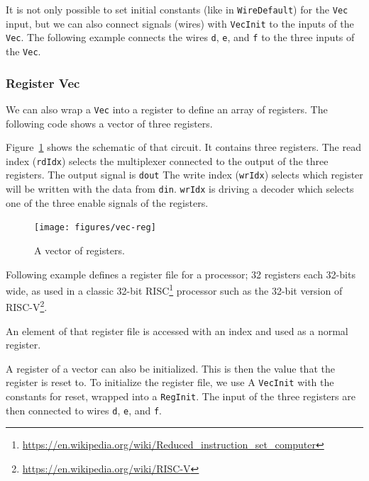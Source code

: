 \documentclass[%
    10pt,
    headinclude, footexclude,
    openright, %
    notitlepage,
    cleardoubleempty,
    headsepline,
    pointlessnumbers,
    bibtotoc, idxtotoc,
    ]{scrbook}
\newcommand{\code}[1]{{\lstinline[basicstyle=\small\ttfamily]{#1}}}
\newcommand{\myref}[2]{\href{#1}{#2}}
\renewcommand{\myref}[2]{{#2}{\footnote{\url{#1}}}}
\begin{document}

It is not only possible to set initial constants (like in \code{WireDefault}) for the \code{Vec} input,
but we can also connect signals (wires) with \code{VecInit} to the inputs of the \code{Vec}.
The following example connects the wires \code{d}, \code{e}, and \code{f} to the three
inputs of the \code{Vec}.



\subsubsection{Register Vec}

We can also wrap a \code{Vec} into a register to define an array of registers.
The following code shows a vector of three registers.

Figure~\ref{fig:vec-reg} shows the schematic of that circuit. It contains three registers.
The read index (\code{rdIdx}) selects the multiplexer connected to the output of the three
registers. The output signal is \code{dout}
The write index (\code{wrIdx}) selects which register will be written with the data
from \code{din}. \code{wrIdx} is driving a decoder which selects one of the three
enable signals of the registers.

\begin{figure}[t]
  \centering
  \texttt{[image: figures/vec-reg]}
  \caption{A vector of registers.}
  \label{fig:vec-reg}
\end{figure}


Following example defines a register file for a processor; 32 registers
each 32-bits wide, as used in a classic 32-bit
\myref{https://en.wikipedia.org/wiki/Reduced_instruction_set_computer}{RISC}
processor such as the 32-bit version of \myref{https://en.wikipedia.org/wiki/RISC-V}{RISC-V}.


\noindent An element of that register file is accessed with an index and used as a normal register.


A register of a vector can also be initialized. This is then the value that the register is reset to.
To initialize the register file, we use A \code{VecInit} with the constants for reset, wrapped
into a \code{RegInit}. The input of the three registers are then connected to wires \code{d},
\code{e}, and \code{f}.
\end{document}
